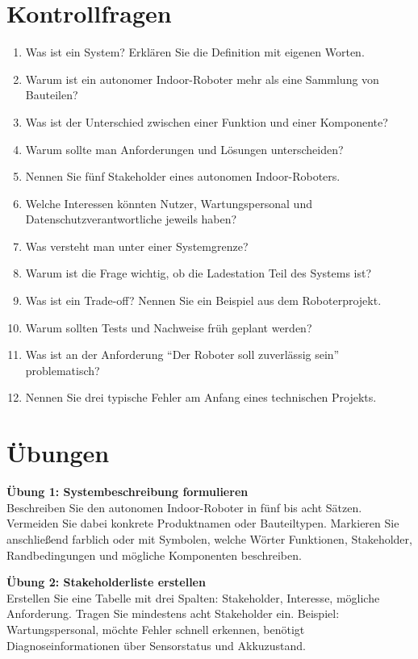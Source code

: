 \section{Kontrollfragen}
\begin{enumerate}
    \item Was ist ein System? Erklären Sie die Definition mit eigenen Worten.
    \item Warum ist ein autonomer Indoor-Roboter mehr als eine Sammlung von Bauteilen?
    \item Was ist der Unterschied zwischen einer Funktion und einer Komponente?
    \item Warum sollte man Anforderungen und Lösungen unterscheiden?
    \item Nennen Sie fünf Stakeholder eines autonomen Indoor-Roboters.
    \item Welche Interessen könnten Nutzer, Wartungspersonal und Datenschutzverantwortliche jeweils haben?
    \item Was versteht man unter einer Systemgrenze?
    \item Warum ist die Frage wichtig, ob die Ladestation Teil des Systems ist?
    \item Was ist ein Trade-off? Nennen Sie ein Beispiel aus dem Roboterprojekt.
    \item Warum sollten Tests und Nachweise früh geplant werden?
    \item Was ist an der Anforderung \enquote{Der Roboter soll zuverlässig sein} problematisch?
    \item Nennen Sie drei typische Fehler am Anfang eines technischen Projekts.
\end{enumerate}

\section{Übungen}
\begin{uebungbox}
\textbf{Übung 1: Systembeschreibung formulieren}\\
Beschreiben Sie den autonomen Indoor-Roboter in fünf bis acht Sätzen. Vermeiden Sie dabei konkrete Produktnamen oder Bauteiltypen. Markieren Sie anschließend farblich oder mit Symbolen, welche Wörter Funktionen, Stakeholder, Randbedingungen und mögliche Komponenten beschreiben.
\end{uebungbox}

\begin{uebungbox}
\textbf{Übung 2: Stakeholderliste erstellen}\\
Erstellen Sie eine Tabelle mit drei Spalten: Stakeholder, Interesse, mögliche Anforderung. Tragen Sie mindestens acht Stakeholder ein. Beispiel: Wartungspersonal, möchte Fehler schnell erkennen, benötigt Diagnoseinformationen über Sensorstatus und Akkuzustand.
\end{uebungbox}

